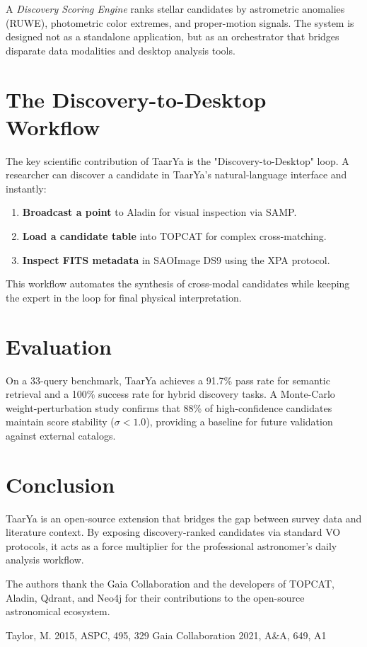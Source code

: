 \documentclass[11pt,twoside]{article}
\begin{document}
A \textit{Discovery Scoring Engine} ranks stellar candidates by astrometric anomalies (RUWE), photometric color extremes, and proper-motion signals. The system is designed not as a standalone application, but as an orchestrator that bridges disparate data modalities and desktop analysis tools.

\section{The Discovery-to-Desktop Workflow}

The key scientific contribution of TaarYa is the "Discovery-to-Desktop" loop. A researcher can discover a candidate in TaarYa's natural-language interface and instantly:
\begin{enumerate}
    \item \textbf{Broadcast a point} to Aladin for visual inspection via SAMP.
    \item \textbf{Load a candidate table} into TOPCAT for complex cross-matching.
    \item \textbf{Inspect FITS metadata} in SAOImage DS9 using the XPA protocol.
\end{enumerate}

This workflow automates the synthesis of cross-modal candidates while keeping the expert in the loop for final physical interpretation.

\section{Evaluation}

On a 33-query benchmark, TaarYa achieves a 91.7\% pass rate for semantic retrieval and a 100\% success rate for hybrid discovery tasks. A Monte-Carlo weight-perturbation study confirms that 88\% of high-confidence candidates maintain score stability ($\sigma < 1.0$), providing a baseline for future validation against external catalogs.

\section{Conclusion}

TaarYa is an open-source extension that bridges the gap between survey data and literature context. By exposing discovery-ranked candidates via standard VO protocols, it acts as a force multiplier for the professional astronomer's daily analysis workflow.

\acknowledgements The authors thank the Gaia Collaboration and the developers of TOPCAT, Aladin, Qdrant, and Neo4j for their contributions to the open-source astronomical ecosystem.

\begin{thebibliography}{}
 Taylor, M. 2015, ASPC, 495, 329
 Gaia Collaboration 2021, A\&A, 649, A1
\end{thebibliography}
\end{document}

